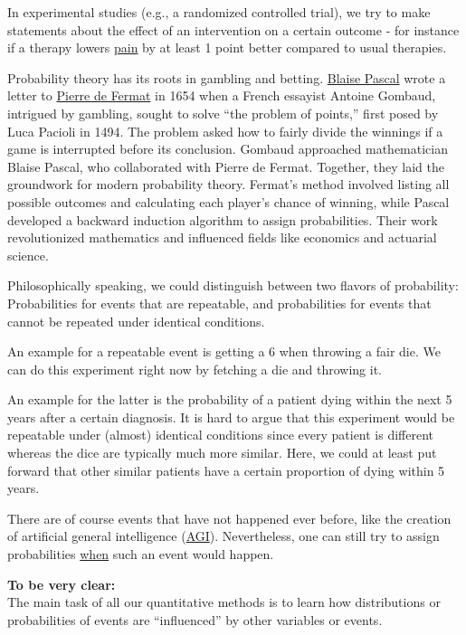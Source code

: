 \documentclass[
]{book}
\begin{document}
In experimental studies (e.g., a randomized controlled trial), we try to make statements about the effect of an intervention on a
certain outcome - for instance if a therapy lowers \href{https://jamanetwork.com/journals/jama/fullarticle/2794765}{pain} by at least 1 point better compared to usual therapies.

Probability theory has its roots in gambling and betting. \href{https://en.wikipedia.org/wiki/Blaise_Pascal}{Blaise Pascal} wrote a letter to \href{https://en.wikipedia.org/wiki/Pierre_de_Fermat}{Pierre de Fermat} in 1654 when a
French essayist Antoine Gombaud, intrigued by gambling, sought to solve ``the problem of points,''
first posed by Luca Pacioli in 1494. The problem asked how to fairly divide the winnings if a game is interrupted before
its conclusion. Gombaud approached mathematician Blaise Pascal, who collaborated with Pierre de Fermat. Together, they laid
the groundwork for modern probability theory. Fermat's method involved listing all possible outcomes and calculating each player's
chance of winning, while Pascal developed a backward induction algorithm to assign probabilities. Their work revolutionized mathematics
and influenced fields like economics and actuarial science.

Philosophically speaking, we could distinguish between two flavors of probability: Probabilities for events that are repeatable, and probabilities for events that cannot be repeated under identical conditions.

An example for a repeatable event is getting a 6 when throwing a fair die. We can do this experiment right now by fetching a die and throwing it.

An example for the latter is the probability of a patient dying within the next 5 years after a certain diagnosis.
It is hard to argue that this experiment would be repeatable under (almost) identical conditions since every patient is different whereas the dice are typically much more similar.
Here, we could at least put forward that other similar patients have a certain proportion of dying within 5 years.

There are of course events that have not happened ever before, like the creation of artificial general intelligence (\href{https://en.wikipedia.org/wiki/Artificial_general_intelligence}{AGI}).
Nevertheless, one can still try to assign probabilities \href{https://research.aimultiple.com/artificial-general-intelligence-singularity-timing/}{when} such an event would happen.

\textbf{To be very clear:}\\
The main task of all our quantitative methods is to learn how distributions or probabilities of events
are ``influenced'' by other variables or events.
\end{document}
